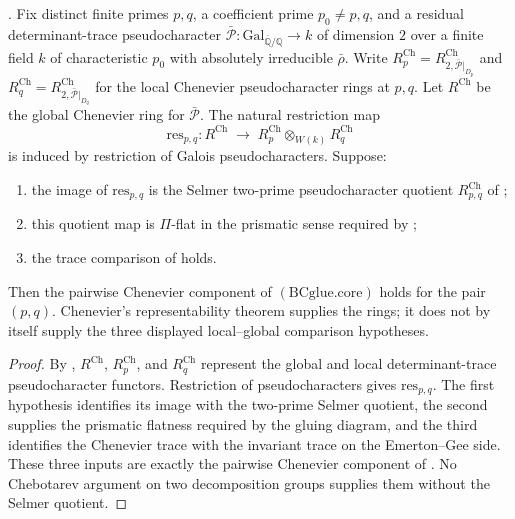 \begin{theorem}
\label{v4-arith:w5-h:thm:ch1-closure}
\ClaimStatusProvedHereConditional. Fix distinct finite primes \(p,q\), a
coefficient prime \(p_{0}\neq p,q\), and a residual determinant-trace
pseudocharacter
\(\bar{\mathcal{P}}\colon\mathrm{Gal}_{\overline{\mathbb{Q}}/\mathbb{Q}}\to k\)
of dimension \(2\) over a finite field \(k\) of characteristic \(p_{0}\)
with absolutely irreducible \(\bar\rho\). Write
\(R^{\mathrm{Ch}}_{p}=R^{\mathrm{Ch}}_{2,\bar{\mathcal{P}}|_{D_{p}}}\) and
\(R^{\mathrm{Ch}}_{q}=R^{\mathrm{Ch}}_{2,\bar{\mathcal{P}}|_{D_{q}}}\)
for the local Chenevier pseudocharacter rings at \(p,q\). Let
\(R^{\mathrm{Ch}}\) be the global Chenevier ring for \(\bar{\mathcal{P}}\).
The natural restriction map
\begin{equation}
\label{v4-arith:w5-h:eq:chenevier-restriction}
\mathrm{res}_{p,q}\colon R^{\mathrm{Ch}}\;\longrightarrow\;R^{\mathrm{Ch}}_{p}\otimes_{W(k)}R^{\mathrm{Ch}}_{q}
\end{equation}
is induced by restriction of Galois pseudocharacters. Suppose:
\begin{enumerate}
\item the image of \(\mathrm{res}_{p,q}\) is the Selmer two-prime
pseudocharacter quotient \(R^{\mathrm{Ch}}_{p,q}\) of
;
\item this quotient map is \(\Pi\)-flat in the prismatic sense required
by ;
\item the trace comparison of
 holds.
\end{enumerate}
Then the pairwise Chenevier component of \((\mathrm{BCglue.core})\)
holds for the pair \((p,q)\). Chenevier's representability theorem
supplies the rings; it does not by itself supply the three displayed
local--global comparison hypotheses.
\end{theorem}

\begin{proof}
By ,
\(R^{\mathrm{Ch}}\), \(R^{\mathrm{Ch}}_{p}\), and
\(R^{\mathrm{Ch}}_{q}\) represent the global and local
determinant-trace pseudocharacter functors. Restriction of
pseudocharacters gives \(\mathrm{res}_{p,q}\). The first hypothesis
identifies its image with the two-prime Selmer quotient, the second
supplies the prismatic flatness required by the gluing diagram, and
the third identifies the Chenevier trace with the invariant trace on
the Emerton--Gee side. These three inputs are exactly the pairwise
Chenevier component of
. No
Chebotarev argument on two decomposition groups supplies them without
the Selmer quotient.
\end{proof}

